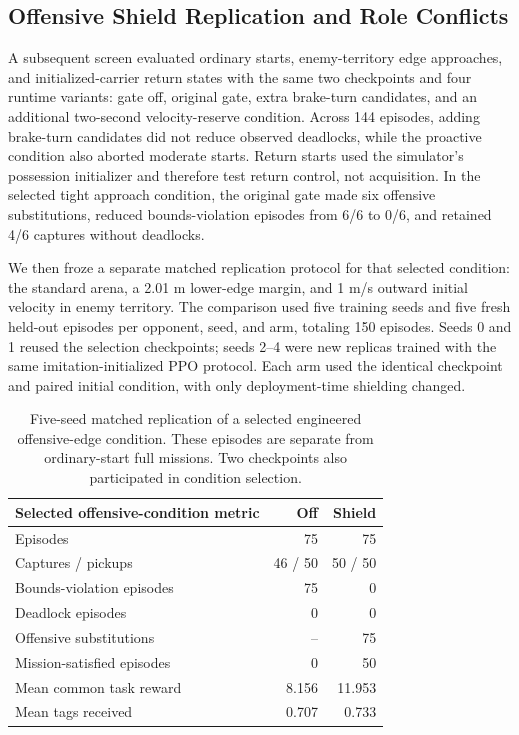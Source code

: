 \documentclass[letterpaper]{article}
\begin{document}
\subsection{Offensive Shield Replication and Role Conflicts}

A subsequent screen evaluated ordinary starts, enemy-territory edge approaches, and initialized-carrier return states with the same two checkpoints and four runtime variants: gate off, original gate, extra brake-turn candidates, and an additional two-second velocity-reserve condition. Across 144 episodes, adding brake-turn candidates did not reduce observed deadlocks, while the proactive condition also aborted moderate starts. Return starts used the simulator's possession initializer and therefore test return control, not acquisition. In the selected tight approach condition, the original gate made six offensive substitutions, reduced bounds-violation episodes from 6/6 to 0/6, and retained 4/6 captures without deadlocks.

We then froze a separate matched replication protocol for that selected condition: the standard arena, a 2.01 m lower-edge margin, and 1 m/s outward initial velocity in enemy territory. The comparison used five training seeds and five fresh held-out episodes per opponent, seed, and arm, totaling 150 episodes. Seeds 0 and 1 reused the selection checkpoints; seeds 2--4 were new replicas trained with the same imitation-initialized PPO protocol. Each arm used the identical checkpoint and paired initial condition, with only deployment-time shielding changed.

\begin{table}[htbp]
\centering
\small
\setlength{\tabcolsep}{3pt}
\begin{tabular}{lrr}
\hline
Selected offensive-condition metric & Off & Shield \\
\hline
Episodes & 75 & 75 \\
Captures / pickups & 46 / 50 & 50 / 50 \\
Bounds-violation episodes & 75 & 0 \\
Deadlock episodes & 0 & 0 \\
Offensive substitutions & -- & 75 \\
Mission-satisfied episodes & 0 & 50 \\
Mean common task reward & 8.156 & 11.953 \\
Mean tags received & 0.707 & 0.733 \\
\hline
\end{tabular}
\caption{Five-seed matched replication of a selected engineered offensive-edge condition. These episodes are separate from ordinary-start full missions. Two checkpoints also participated in condition selection.}
\label{tab:offensive-five}
\end{table}
\end{document}
